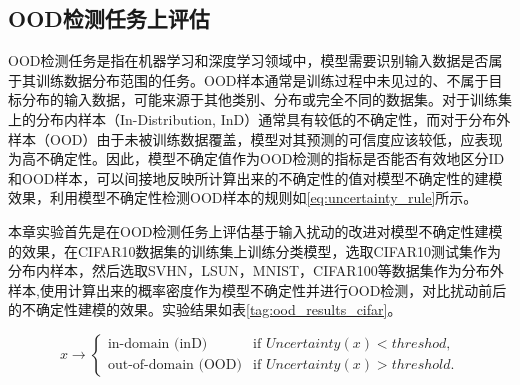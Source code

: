 \subsection{OOD检测任务上评估}
OOD检测任务是指在机器学习和深度学习领域中，模型需要识别输入数据是否属于其训练数据分布范围的任务。OOD样本通常是训练过程中未见过的、不属于目标分布的输入数据，可能来源于其他类别、分布或完全不同的数据集。对于训练集上的分布内样本（In-Distribution, InD）通常具有较低的不确定性，而对于分布外样本（OOD）由于未被训练数据覆盖，模型对其预测的可信度应该较低，应表现为高不确定性。因此，模型不确定值作为OOD检测的指标是否能否有效地区分ID和OOD样本，可以间接地反映所计算出来的不确定性的值对模型不确定性的建模效果，利用模型不确定性检测OOD样本的规则如\ref{eq:uncertainty_rule}所示。

本章实验首先是在OOD检测任务上评估基于输入扰动的改进对模型不确定性建模的效果，在CIFAR10数据集的训练集上训练分类模型，选取CIFAR10测试集作为分布内样本，然后选取SVHN，LSUN，MNIST，CIFAR100等数据集作为分布外样本,使用计算出来的概率密度作为模型不确定性并进行OOD检测，对比扰动前后的不确定性建模的效果。实验结果如表\ref{tag:ood_results_cifar}。

\begin{equation}
x {\rightarrow}
\begin{cases} 
\text{in-domain (inD)} & \text{if } Uncertainty(x) < threshod, \\
\text{out-of-domain (OOD)} & \text{if } Uncertainty(x) > threshold.
\end{cases}
\label{eq:uncertainty_rule}
\end{equation}



